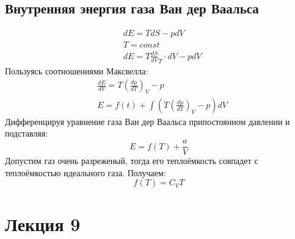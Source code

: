 \documentclass[a4paper, 12pt]{article}
\begin{document}
	\subsection{Внутренняя энергия газа Ван дер Ваальса}
	\begin{equation*}
		\begin{aligned}
			& dE = TdS - pdV                          \\
			& T = const                               \\
			& dE = T \frac{dS}{dV}_{T} \cdot dV - pdV 
		\end{aligned}
	\end{equation*}
	Пользуясь соотношениями Максвелла:
	\begin{equation*}
		\begin{aligned}
			& \frac{dE}{dV} = T(\frac{dp}{dT})_{V} - p      \\
			& E = f(t) + \int (T(\frac{dp}{dT})_{V} - p) dV 
		\end{aligned}
	\end{equation*}
	Дифференцируя уравнение газа Ван дер Ваальса припостоянном давлении и подставляя:
	\begin{equation*}
		E = f(T) + \frac{a}{V}
	\end{equation*}
	Допустим газ очень разреженый, тогда его теплоёмкость совпадет с теплоёмкостью идеального газа. Получаем:
	\begin{equation*}
		f(T) = C_{V} T
	\end{equation*}
	\section{Лекция 9}
\end{document}
